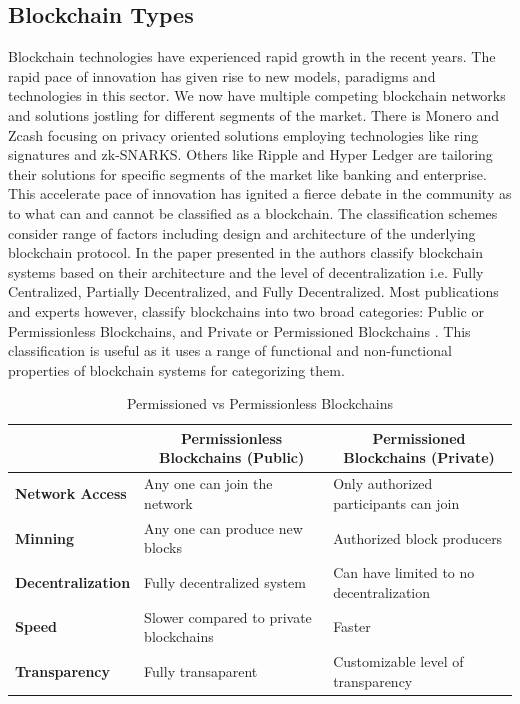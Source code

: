 \subsection{Blockchain Types}
Blockchain technologies have experienced rapid growth in the recent years. The rapid pace of innovation has given rise to new models, paradigms and technologies in this sector. We now have multiple competing blockchain networks and solutions jostling for different segments of the market. There is Monero and Zcash focusing on privacy oriented solutions employing technologies like ring signatures \cite{paper:008} and zk-SNARKS. Others like Ripple and Hyper Ledger are tailoring their solutions for specific segments of the market like banking and enterprise. This accelerate pace of innovation has ignited a fierce debate in the community as to what can and cannot be classified as a blockchain. The classification schemes consider range of factors including design and architecture of the underlying blockchain protocol. In the paper presented in \cite{7930224} the authors classify blockchain systems based on their architecture and the level of decentralization i.e. Fully Centralized, Partially Decentralized, and Fully Decentralized. Most publications and experts however, classify blockchains into two broad categories: Public or Permissionless Blockchains, and Private or Permissioned Blockchains \cite{misc:017}. This classification is useful as it uses a range of functional and non-functional properties of blockchain systems for categorizing them.
\vspace{1cm}
\begin{table}[h]
\begin{tabular}{|l|l|l|}
\hline
                          & \multicolumn{1}{c|}{\textbf{Permissionless Blockchains (Public)}} & \multicolumn{1}{c|}{\textbf{Permissioned Blockchains (Private)}} \\ \hline
\textbf{Network Access}   & Any one can join the network                                      & Only authorized participants can join                            \\ \hline
\textbf{Minning}          & Any one can produce new blocks                                    & Authorized block producers                                       \\ \hline
\textbf{Decentralization} & Fully decentralized system                                        & Can have limited to no decentralization                          \\ \hline
\textbf{Speed}            & Slower compared to private blockchains                            & Faster                                                           \\ \hline
\textbf{Transparency}     & Fully transaparent                                                & Customizable level of transparency                               \\ \hline
\end{tabular}
\caption {Permissioned vs Permissionless Blockchains}
\end{table}
\vspace{1cm}
